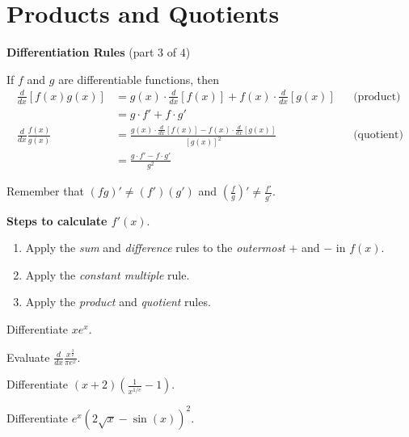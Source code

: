 \documentclass[../main.tex]{subfiles}
\begin{document}

\section{Products and Quotients}
\begin{mdframed}[style=simple]
  \textbf{Differentiation Rules} \hfill {\footnotesize (part \(3\) of \(4\))}

  If \(f\) and \(g\) are differentiable functions, then
  \begin{align*}
    \frac{d}{dx} [f(x)g(x)] 
    &= {g(x) \cdot \frac{d}{dx} [f(x)] + f(x) \cdot \frac{d}{dx}[g(x)]}
    && \text{(product)} \\
    &= g \cdot f' + f \cdot g' \\[1em]
    \frac{d}{dx} \frac{f(x)}{g(x)}
    &= {\frac{g(x) \cdot \frac{d}{dx} [f(x)] - f(x) \cdot \frac{d}{dx}[g(x)] }{ [g(x)]^{2} }}
    && \text{(quotient)} \\
    &= \frac{g \cdot f' - f \cdot g'}{g^{2}}
  \end{align*}
\end{mdframed}
\faExclamationTriangle{} Remember that \((fg)' \ne (f')(g')\) and \(\left(\frac{f}{g}\right)' \ne \frac{f'}{g'}\).

\textbf{Steps to calculate \(f'(x)\)}. 
\begin{enumerate}[label=(\arabic*)]
  \item Apply the \emph{sum} and \emph{difference} rules to the \emph{outermost} \(+\) and \(-\) in \(f(x)\). 
  \item Apply the \emph{constant multiple} rule.
  \item Apply the \emph{product} and \emph{quotient} rules.
\end{enumerate}
\bigskip

\begin{example}
  Differentiate \(xe^{x}\).
\end{example}
\vspace{1in}

\begin{example}
  Evaluate \(\frac{d}{dx} \frac{x^{\frac{3}{2}}}{\pi e^{x}}\).
\end{example}
\vfill
\clearpage

\begin{example}
  Differentiate \((x+2)\left( \frac{1}{x^{1/e}} - 1 \right)\).
\end{example}
\vfill
\clearpage

\begin{example}
  Differentiate \(e^{x}(2 \sqrt{x} - \sin(x))^{2}\).
\end{example}
\clearpage
\end{document}
